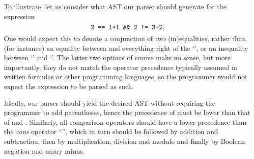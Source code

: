 To illustrate, let us consider what AST our parser should generate for the
expression
\[ \texttt{2 == 1+1 \&\& 2 != 3-2} .\]
One would expect this to denote a conjunction of two (in)equalities, rather than
(for instance) an equality between  and everything right of the
`\code{==}', or an inequality between `' and `'.
%
The latter two options of course make no sense, but more importantly, they do
not match the operator precedence typically assumed in written formulas or other
programming languages, so the programmer would not expect the expression to be
parsed as such.

Ideally, our parser should yield the desired AST without requiring the
programmer to add parentheses, hence the precedence of \code{\&\&} must be lower
than that of \code{==} and \code{!=}.
Similarly, all comparison operators should have a lower precedence than the
\emph{cons} operator ``\code{:}'', which in turn should be followed by addition
and subtraction, then by multiplication, division and modulo and finally by
Boolean negation and unary minus.

